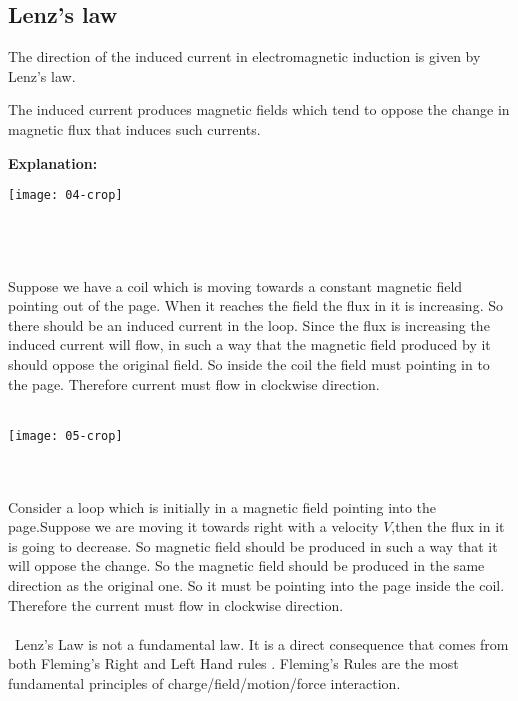 \subsection{Lenz's law }
The direction of the induced current in electromagnetic induction is given by Lenz's law.\\
\begin{definition}
The induced current produces magnetic fields which tend to oppose the change in magnetic flux that induces such currents.\\
\end{definition}
\textbf{\large Explanation:}\\
\begin{minipage}{.60\textwidth}
	\begin{center}
		\texttt{[image: 04-crop]}
	\end{center}
\end{minipage}\\\\\\
Suppose we have a coil which is moving towards a constant magnetic field pointing out of the page. When it reaches the field the flux in it is increasing. So there should be an induced current in the loop. Since the flux is increasing the induced current will flow, in such a way that the magnetic field produced by it should oppose the original field. So inside the coil the field must pointing in to the page. Therefore current must flow in clockwise direction.\\\\
\begin{minipage}{.60\textwidth}
	\begin{center}
		\texttt{[image: 05-crop]}
	\end{center}
\end{minipage}\\\\
Consider a loop which is initially in a magnetic field pointing into the page.Suppose we are moving it towards right with a velocity $V$,then the flux in it is going to decrease. So magnetic field should be produced in such a way that it will oppose the change. So the magnetic field should be produced in the same direction as the original one. So it must be pointing into the page inside the coil. Therefore the current must flow in clockwise direction.\\\\\	Lenz's Law is not a fundamental law. It is a direct consequence that comes from both Fleming's Right and Left Hand rules . Fleming's Rules are the most fundamental principles of charge/field/motion/force interaction.
